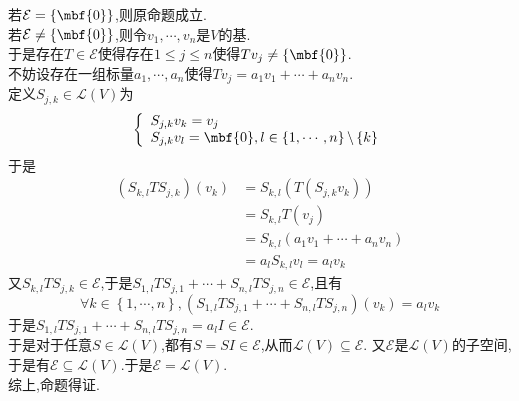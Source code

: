 \documentclass{ctexart}
\begin{document}
\begin{solution}[Proof.]
    若$\mathcal{E}=\left\{\mbf{0}\right\}$,则原命题成立.\\
    若$\mathcal{E}\neq\left\{\mbf{0}\right\}$,则令$v_1,\cdots,v_n$是$V$的基.\\
    于是存在$T\in\mathcal{E}$使得存在$1\leqslant j\leqslant n$使得$Tv_j\neq\left\{\mbf{0}\right\}$.\\
    不妨设存在一组标量$a_1,\cdots,a_n$使得$Tv_j=a_1v_1+\cdots+a_nv_n$.\\
    定义$S_{j,k}\in\mathcal{L}(V)$为
    $$\left\{\begin{array}{l}
        S_{j,k}v_k=v_j\\
        S_{j,k}v_l=\mbf{0},l\in\left\{1,\cdots,n\right\}\backslash\left\{k\right\}
    \end{array}\right.$$
    于是
    $$\begin{aligned}
        (S_{k,l}TS_{j,k})(v_k)
        &= S_{k,l}\left(T\left(S_{j,k}v_k\right)\right) \\
        &= S_{k,l}T(v_j) \\
        &= S_{k,l}\left(a_1v_1+\cdots+a_nv_n\right) \\
        &= a_lS_{k,l}v_l=a_lv_k
    \end{aligned}$$
    又$S_{k,l}TS_{j,k}\in\mathcal{E}$,于是$S_{1,l}TS_{j,1}+\cdots+S_{n,l}TS_{j,n}\in\mathcal{E}$,且有
    $$\forall k\in\left\{1,\cdots,n\right\},\left(S_{1,l}TS_{j,1}+\cdots+S_{n,l}TS_{j,n}\right)(v_k)=a_lv_k$$
    于是$S_{1,l}TS_{j,1}+\cdots+S_{n,l}TS_{j,n}=a_lI\in\mathcal{E}$.\\
    于是对于任意$S\in\mathcal{L}(V)$,都有$S=SI\in\mathcal{E}$,从而$\mathcal{L}(V)\subseteq\mathcal{E}$.
    又$\mathcal{E}$是$\mathcal{L}(V)$的子空间,于是有$\mathcal{E}\subseteq\mathcal{L}(V)$.于是$\mathcal{E}=\mathcal{L}(V)$.\\
    综上,命题得证.
\end{solution}
\end{document}

